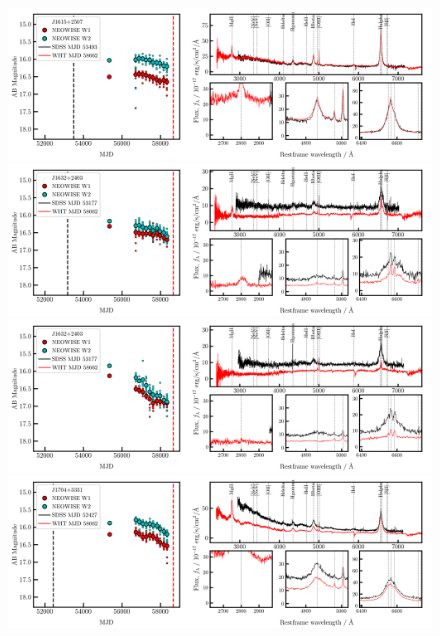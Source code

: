 \documentclass[a4paper,fleqn,usenatbib]{mnras}
\begin{document}
\begin{figure}
  \centering
  \includegraphics[width=16.7cm, trim=0.0cm 0.05cm 0.2cm 0.1cm, clip]
  {../plots/LCs_and_spectra/J1615+2507_landscape_temp.png}
  \includegraphics[width=16.7cm, trim=0.0cm 0.05cm 0.2cm 0.1cm, clip]
  {../plots/LCs_and_spectra/J1632+2403_landscape_temp.png}
  \includegraphics[width=16.7cm, trim=0.0cm 0.05cm 0.2cm 0.1cm, clip]
  {../plots/LCs_and_spectra/J1634+1118_landscape_temp.png}        
  \includegraphics[width=16.7cm, trim=0.0cm 0.05cm 0.2cm 0.1cm, clip]
  {../plots/LCs_and_spectra/J1704+3331_landscape_temp.png}
    \vspace{-12pt}
  \caption[]{}
  \label{fig:all_spectra_c}
\end{figure}
\end{document}
